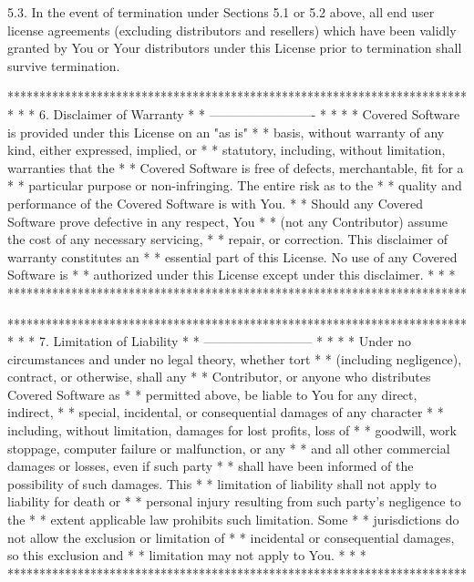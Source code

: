 5.3. In the event of termination under Sections 5.1 or 5.2 above, all
end user license agreements (excluding distributors and resellers) which
have been validly granted by You or Your distributors under this License
prior to termination shall survive termination.

************************************************************************
*                                                                      *
*  6. Disclaimer of Warranty                                           *
*  -------------------------                                           *
*                                                                      *
*  Covered Software is provided under this License on an "as is"       *
*  basis, without warranty of any kind, either expressed, implied, or  *
*  statutory, including, without limitation, warranties that the       *
*  Covered Software is free of defects, merchantable, fit for a        *
*  particular purpose or non-infringing. The entire risk as to the     *
*  quality and performance of the Covered Software is with You.        *
*  Should any Covered Software prove defective in any respect, You     *
*  (not any Contributor) assume the cost of any necessary servicing,   *
*  repair, or correction. This disclaimer of warranty constitutes an   *
*  essential part of this License. No use of any Covered Software is   *
*  authorized under this License except under this disclaimer.         *
*                                                                      *
************************************************************************

************************************************************************
*                                                                      *
*  7. Limitation of Liability                                          *
*  --------------------------                                          *
*                                                                      *
*  Under no circumstances and under no legal theory, whether tort      *
*  (including negligence), contract, or otherwise, shall any           *
*  Contributor, or anyone who distributes Covered Software as          *
*  permitted above, be liable to You for any direct, indirect,         *
*  special, incidental, or consequential damages of any character      *
*  including, without limitation, damages for lost profits, loss of    *
*  goodwill, work stoppage, computer failure or malfunction, or any    *
*  and all other commercial damages or losses, even if such party      *
*  shall have been informed of the possibility of such damages. This   *
*  limitation of liability shall not apply to liability for death or   *
*  personal injury resulting from such party's negligence to the       *
*  extent applicable law prohibits such limitation. Some               *
*  jurisdictions do not allow the exclusion or limitation of           *
*  incidental or consequential damages, so this exclusion and          *
*  limitation may not apply to You.                                    *
*                                                                      *
************************************************************************

